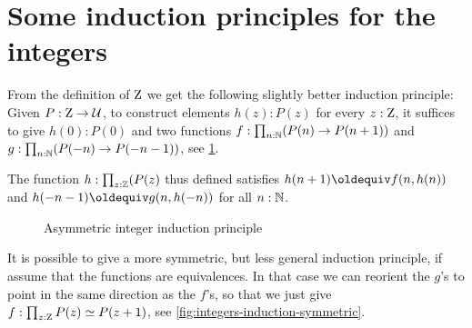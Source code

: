 \documentclass[a4,12pt]{amsart}
\begin{document}
\section{Some induction principles for the integers}
\label{sec:integers-induction}

From the definition of $\mathrm{Z}$ we get the following slightly better induction principle:
Given $P : \mathrm{Z} \to \mathcal{U}$, to construct elements $h(z) : P(z)$ for every $z : \mathrm{Z}$,
it suffices to give $h(0): P(0)$ and two functions
$f : \prod_{n:\mathbb{N}}(P(n) \to P(n+1))$ and
$g : \prod_{n:\mathbb{N}}(P(-n) \to P(-n-1))$, 
see \cref{fig:integers-induction-asymmetric}.

The function $h:\prod_{z:\mathbb{Z}}(P(z)$ thus defined satisfies
$h(n+1)\jdeq f(n,h(n))$ and $h(-n-1)\jdeq g(n,h(-n))$ for all $n:\mathbb{N}$.

\begin{figure}[h]
  \centering
  \caption{Asymmetric integer induction principle}
  \label{fig:integers-induction-asymmetric}
\end{figure}


It is possible to give a more symmetric, but less general induction principle,
if assume that the functions are equivalences.
In that case we can reorient the $g$'s to point in the same direction as the $f$'s,
so that we just give $f : \prod_{z:\mathrm{Z}}P(z) \simeq P(z+1)$, 
see \cref{fig:integers-induction-symmetric}.
\end{document}
